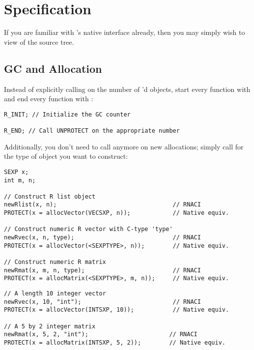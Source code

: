 \section{Specification}\label{specification}

If you are familiar with \R's native \C interface already, then you may simply 
wish to view  of the \thispackage source tree.



\subsection{GC and Allocation}

Instead of explicitly calling  on the number of 
'd objects, start every  function with  
and end every  function with :

\begin{lstlisting}[language=fanC,title=GC Counter]
R_INIT; // Initialize the GC counter

R_END; // Call UNPROTECT on the appropriate number
\end{lstlisting}


Additionally, you don't need to call  anymore on new allocations; 
simply call  for the type of \R object you want to construct:
\begin{lstlisting}[language=fanC,title=Allocation]
SEXP x;
int m, n;

// Construct R list object
newRlist(x, n);                                 // RNACI
PROTECT(x = allocVector(VECSXP, n));            // Native equiv.

// Construct numeric R vector with C-type 'type'
newRvec(x, n, type);                            // RNACI
PROTECT(x = allocVector(<SEXPTYPE>, n));        // Native equiv.

// Construct numeric R matrix
newRmat(x, m, n, type);                         // RNACI
PROTECT(x = allocMatrix(<SEXPTYPE>, m, n));     // Native equiv.
\end{lstlisting}


\begin{lstlisting}[language=fanC,title=Allocation Examples]
// A length 10 integer vector
newRvec(x, 10, "int");                          // RNACI
PROTECT(x = allocVector(INTSXP, 10));           // Native equiv.

// A 5 by 2 integer matrix
newRmat(x, 5, 2, "int");                       // RNACI
PROTECT(x = allocMatrix(INTSXP, 5, 2));        // Native equiv.
\end{lstlisting}

